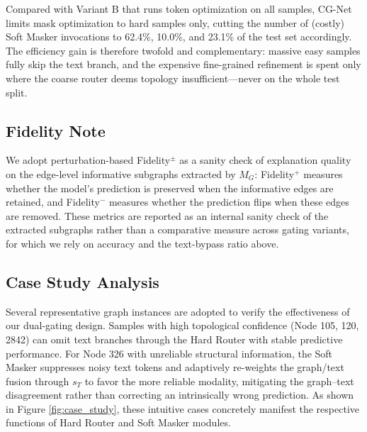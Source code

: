 \documentclass[preprint,12pt,authoryear]{elsarticle}
\begin{document}
\begin{table}[!t]
\centering
\small
\caption{Measured per-branch latency and text-workload shares at $\tau=0.7$. \texttt{Soft scope} is the fraction of test nodes that pay the test-time mask optimization. Absolute timings depend on the evaluation hardware described in Section~\ref{sec:overhead_analysis}; relative shares are architecture-level.}
\label{tab:efficiency}
\end{table}

Compared with Variant B that runs token optimization on all samples, CG-Net limits mask optimization to hard samples only, cutting the number of (costly) Soft Masker invocations to 62.4\%, 10.0\%, and 23.1\% of the test set accordingly. The efficiency gain is therefore twofold and complementary: massive easy samples fully skip the text branch, and the expensive fine-grained refinement is spent only where the coarse router deems topology insufficient---never on the whole test split.

\subsection{Fidelity Note}
We adopt perturbation-based Fidelity$^\pm$ as a sanity check of explanation quality on the edge-level informative subgraphs extracted by $M_G$: Fidelity$^+$ measures whether the model's prediction is preserved when the informative edges are retained, and Fidelity$^-$ measures whether the prediction flips when these edges are removed. These metrics are reported as an internal sanity check of the extracted subgraphs rather than a comparative measure across gating variants, for which we rely on accuracy and the text-bypass ratio above.

\subsection{Case Study Analysis}
Several representative graph instances are adopted to verify the effectiveness of our dual-gating design. Samples with high topological confidence (Node 105, 120, 2842) can omit text branches through the Hard Router with stable predictive performance. For Node 326 with unreliable structural information, the Soft Masker suppresses noisy text tokens and adaptively re-weights the graph/text fusion through $s_T$ to favor the more reliable modality, mitigating the graph--text disagreement rather than correcting an intrinsically wrong prediction.
As shown in Figure \ref{fig:case_study}, these intuitive cases concretely manifest the respective functions of Hard Router and Soft Masker modules.
\end{document}
